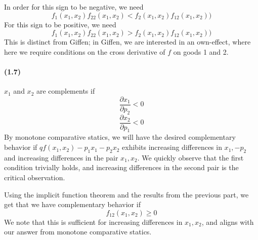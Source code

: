 \documentclass[10pt,letter]{article}
\begin{document}
In order for this sign to be negative, we need
\[ f_1(x_1, x_2)f_{22}(x_1, x_2) < f_2(x_1, x_2)f_{12}(x_1, x_2)) \]
For this sign to be positive, we need
\[ f_1(x_1, x_2)f_{22}(x_1, x_2) > f_2(x_1, x_2)f_{12}(x_1, x_2)) \]
This is distinct from Giffen; in Giffen, we are interested in an own-effect, where here we require conditions on the cross derivative of $f$ on goods 1 and 2.
\paragraph{(1.7)}
$x_1$ and $x_2$ are complements if
\[ \frac{\partial x_1}{\partial p_2} < 0 \]
\[ \frac{\partial x_2}{\partial p_1} < 0 \]
By monotone comparative statics, we will have the desired complementary behavior if $qf(x_1, x_2) - p_1 x_1 - p_2 x_2$ exhibits increasing differences in $x_1, -p_2$ and increasing differences in the pair $x_1, x_2$. We quickly observe that the first condition trivially holds, and increasing differences in the second pair is the critical observation.

Using the implicit function theorem and the results from the previous part, we get that we have complementary behavior if
\[ f_{12}(x_1, x_2) \ge  0 \]
We note that this is sufficient for increasing differences in $x_1, x_2$, and aligns with our answer from monotone comparative statics.
\end{document}
